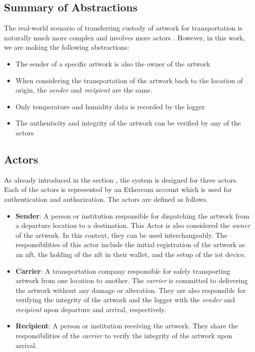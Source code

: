 \subsection*{Summary of Abstractions}
The real-world scenario of transferring custody of artwork for transportation is naturally much more complex and involves more actors \cite{artintransit}. However, in this work, we are making the following abstractions:
\begin{itemize}
    \item The sender of a specific artwork is also the owner of the artwork
    \item When considering the transportation of the artwork back to the location of origin, the \textit{sender} and \textit{recipient} are the same.
    \item Only temperature and humidity data is recorded by the logger
    \item The authenticity and integrity of the artwork can be verified by any of the actors
\end{itemize}

\subsection{Actors}
As already introduced in the section , the system is designed for three actors. Each of the actors is represented by an Ethereum account which is used for authentication and authorization. The actors are defined as follows.

\begin{itemize}[align=left, font=\itshape]
    \item \textbf{Sender}: A person or institution responsible for dispatching the artwork from a departure location to a destination. This Actor is also considered the \textit{owner} of the artwork. In this context, they can be used interchangeably. The responsibilities of this actor include the initial registration of the artwork as an \gls{nft}, the holding of the \gls{nft} in their \gls{wallet}, and the setup of the \gls{iot} device.

    \item \textbf{Carrier}: A transportation company responsible for safely transporting artwork from one location to another. The \textit{carrier} is committed to delivering the artwork without any damage or alteration. They are also responsible for verifying the integrity of the artwork and the logger with the \textit{sender} and \textit{recipient} upon departure and arrival, respectively.

    \item \textbf{Recipient}: A person or institution receiving the artwork. They share the responsibilities of the \textit{carrier} to verify the integrity of the artwork upon arrival. 
\end{itemize}

